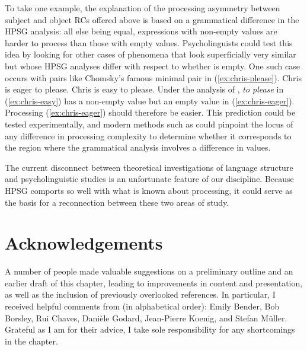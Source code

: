 \documentclass[output=paper
	        ,collection
	        ,collectionchapter
 	        ,biblatex
                ,babelshorthands
                ,newtxmath
                ,draftmode
                ,colorlinks, citecolor=brown
]{langscibook}
\begin{document}
To take one example, the explanation of the processing asymmetry between subject and object RCs
offered above is based on a grammatical difference in the HPSG analysis:  all else being equal,
expressions with non-empty \isi{\slasch} values are harder to process than those with empty \slasch values.  Psycholinguists could test this idea by looking for other cases of phenomena that look superficially very similar but whose HPSG analyses differ with respect to whether \slasch is empty.  One such case occurs with pairs like  Chomsky's famous minimal pair in (\ref{ex:chris-please}).
\eal\label{ex:chris-please}
\ex Chris is eager to please.\label{ex:chris-eager}
\ex Chris is easy to please.\label{ex:chris-easy}
\zl
Under the analysis of \citet{ps2}, \emph{to please} in (\ref{ex:chris-easy}) has a non-empty \isi{\slasch} value but an empty \slasch value in (\ref{ex:chris-eager}).  Processing (\ref{ex:chris-eager}) should therefore be easier.  This prediction could be tested experimentally, and modern methods such as  could pinpoint the locus of any difference in processing complexity to determine whether it corresponds to the region where the grammatical analysis involves a difference in \isi{\slasch} values.

The current disconnect between theoretical investigations of language structure and psycholinguistic studies is an unfortunate feature of our discipline.  Because HPSG comports so well with what is known about processing, it could serve as the basis for a reconnection between these two areas of study.

\section*{Acknowledgements}

A number of people made valuable suggestions on a preliminary outline and an earlier draft of this
chapter, leading to improvements in content and presentation, as well as the inclusion of previously
overlooked references.  In particular, I received helpful comments from (in alphabetical order):
Emily Bender, Bob Borsley, Rui Chaves, Danièle Godard, Jean-Pierre Koenig, and Stefan Müller.
Grateful as I am for their advice, I take sole responsibility for any shortcomings in the chapter. 

{\sloppy
\printbibliography[heading=subbibliography,notkeyword=this] 
}
\end{document}

